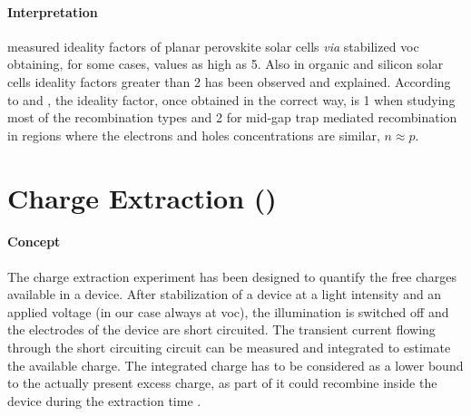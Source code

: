 		\paragraph{Interpretation} %
		 measured ideality factors of planar perovskite solar cells \textit{via} stabilized \gls{voc} obtaining, for some cases, values as high as 5.
		Also in organic \cite{Kirchartz2011,Kirchartz2012} and silicon solar cells \cite{Breitenstein2006} ideality factors greater than 2 has been observed and explained.
		According to  and , the ideality factor, once obtained in the correct way, is 1 when studying most of the recombination types and 2 for mid-gap trap mediated recombination in regions where the electrons and holes concentrations are similar, $n \approx p$.

\section{Charge Extraction ()}

	\paragraph{Concept} The charge extraction experiment has been designed \cite{Duffy2000} to quantify the free charges available in a device.
	After stabilization of a device at a light intensity and an applied voltage (in our case always at \gls{voc}), the illumination is switched off and the electrodes of the device are short circuited.
	The transient current flowing through the short circuiting circuit can be measured and integrated to estimate the available charge.
	The integrated charge has to be considered as a lower bound to the actually present excess charge, as part of it could recombine inside the device during the extraction time \cite{ORegan2005}.

